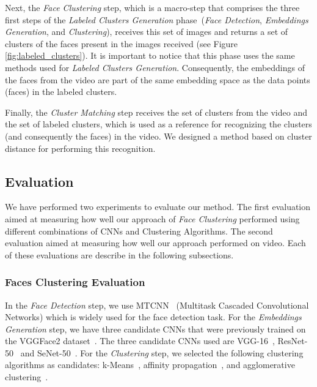 Next, the \textit{Face Clustering} step, which is a macro-step that comprises the three first steps of the \emph{Labeled Clusters Generation} phase~(\emph{Face Detection}, \emph{Embeddings Generation}, and \emph{Clustering}), receives this set of images and returns a set of clusters of the faces present in the images received  (see Figure \ref{fig:labeled_clusters}).
It is important to notice that this phase uses the same methods used for \emph{Labeled Clusters Generation}.
Consequently, the embeddings of the faces from the video are part of the same embedding space as the data points (faces) in the labeled clusters.

Finally, the \textit{Cluster Matching} step receives the set of clusters from the video and the set of labeled clusters, which is used as a reference for recognizing the clusters (and consequently the faces) in the video.
We designed a method based on cluster distance for performing this recognition.

\subsection{Evaluation}

We have performed two experiments to evaluate our method. 
The first evaluation aimed at measuring how well our approach of \emph{Face Clustering} performed using different combinations of CNNs and Clustering Algorithms. 
The second evaluation aimed at measuring how well our approach performed on video. Each of these evaluations are describe in the following subsections.

\subsubsection{Faces Clustering Evaluation}
\label{faces_clustering_evaluation}
In the \emph{Face Detection} step, we use MTCNN~\cite{mtcnn} (Multitask
Cascaded Convolutional Networks) which is widely used for the face detection task.
For the \emph{Embeddings Generation} step, we have three candidate CNNs that were previously trained on the VGGFace2 dataset~\cite{cao2018vggface2}. The three candidate CNNs used are VGG-16~\cite{vgg16}, ResNet-50~\cite{resnet} and SeNet-50~\cite{senet}. 
For the \emph{Clustering} step, we selected the following clustering algorithms as candidates: k-Means~\cite{lloyd1982least}, affinity propagation~\cite{frey2007clustering}, and agglomerative clustering~\cite{ward1963hierarchical}.

